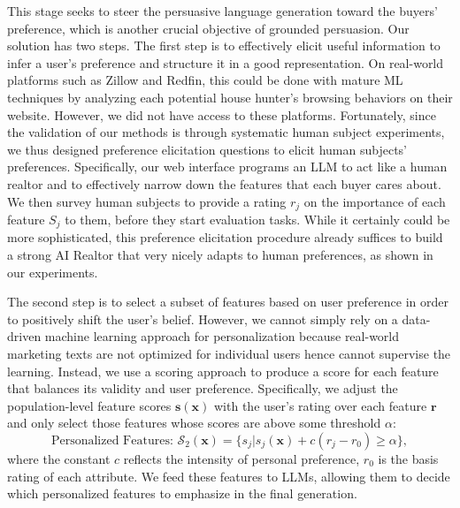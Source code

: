 This stage seeks to steer the persuasive language generation toward the buyers' preference, which is another crucial objective of grounded persuasion. 
Our solution has two steps. The first step is to effectively elicit useful information to infer a user's preference and structure it in a good representation. On real-world platforms such as Zillow and Redfin, this could be done with mature ML techniques by analyzing each potential house hunter's browsing behaviors on their website. However, we did not have access to these platforms. Fortunately, since the validation of our methods is through systematic human subject experiments, we thus designed preference elicitation questions to elicit human subjects' preferences. Specifically, our web interface programs an LLM to act like a human realtor and to effectively narrow down the features that each buyer cares about. We then survey human subjects to provide a rating $r_j$ on the importance of each feature $S_j$ to them, before they start evaluation tasks. While it certainly could be more sophisticated,  this preference elicitation procedure already suffices to build a strong AI Realtor that very nicely adapts to human preferences, as shown in our experiments. 

The second step is to select a subset of features based on  user preference in order to positively shift the user's belief. 
However, we cannot simply rely on a data-driven machine learning approach for personalization because   real-world marketing texts are not optimized for individual users hence cannot supervise the learning. 
Instead, we use a scoring approach to produce a score for each feature that balances its validity and user preference. Specifically, we adjust the population-level feature scores $\mathbf{s}(\mathbf{x})$ with the user's rating over each feature $\mathbf{r}$ and only select those features whose scores are above some threshold $\alpha$: 
\begin{equation*}
     \text{Personalized Features: }  \mathcal{S}_2(\mathbf{x}) = \{ s_j | s_j(\mathbf{x}) +   c (r_j - r_0) \geq \alpha  \},  
 \end{equation*} 
where the constant $c$ reflects the intensity of personal preference, $r_0$ is the basis rating of each attribute.  We feed these features to LLMs, allowing them to decide which personalized features to emphasize in the final generation.

